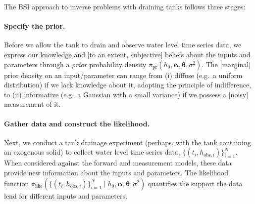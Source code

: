 \documentclass[a4paper,fleqn]{cas-dc}
\newcommand\thedata {$\{(t_i,h_{\text{obs}, i})\}_{i=1}^{N}$\xspace}
\newcommand\thedatanomath {\{(t_i,h_{\text{obs}, i})\}_{i=1}^{N}}
\begin{document}

The BSI approach to inverse problems with draining tanks follows three stages:


\paragraph{Specify the prior.}
Before we allow the tank to drain and observe water level time series data, we express our knowledge and [to an extent, subjective] beliefs about the inputs and parameters through a \emph{prior} probability density $\pi_{\text{pr}}(h_0, \boldsymbol \alpha, \boldsymbol \theta, \sigma^2)$.
The [marginal] prior density on an input/parameter can range from 
(i) diffuse (e.g.\ a uniform distribution) if we lack knowledge about it, adopting the principle of indifference, to 
(ii) informative (e.g.\ a Gaussian with a small variance) if we possess a [noisy] measurement of it. 
\cite{van2021bayesian}


\paragraph{Gather data and construct the likelihood.}
Next, we conduct a tank drainage experiment (perhaps, with the tank containing an exogenous solid) to collect water level time series data, \thedata. 
When considered against the forward and measurement models, these data provide new information about the inputs and parameters. The likelihood function $\pi_{\text{like}}(\thedatanomath \mid h_0,\boldsymbol  \alpha, \boldsymbol \theta, \sigma^2 )$ quantifies the support the data lend for different inputs and parameters.
\end{document}

